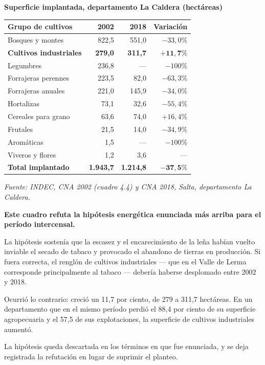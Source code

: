 {\sffamily\bfseries\footnotesize Superficie implantada, departamento La Caldera (hectáreas)\par}
\vspace{0.5em}
{\small
\setlength{\LTpre}{0.6em}\setlength{\LTpost}{1.2em}
\begin{longtable}{@{}lrrr@{}}
\toprule
Grupo de cultivos & 2002 & 2018 & Variación \\
\midrule
\endhead
Bosques y montes & 822,5 & 551,0 & $-33,0\%$ \\
\textbf{Cultivos industriales} & \textbf{279,0} & \textbf{311,7} & $\mathbf{+11,7\%}$ \\
Legumbres & 236,8 & --- & $-100\%$ \\
Forrajeras perennes & 223,5 & 82,0 & $-63,3\%$ \\
Forrajeras anuales & 221,0 & 145,9 & $-34,0\%$ \\
Hortalizas & 73,1 & 32,6 & $-55,4\%$ \\
Cereales para grano & 63,6 & 74,0 & $+16,4\%$ \\
Frutales & 21,5 & 14,0 & $-34,9\%$ \\
Aromáticas & 1,5 & --- & $-100\%$ \\
Viveros y flores & 1,2 & 3,6 & --- \\
\midrule
\textbf{Total implantado} & \textbf{1.943,7} & \textbf{1.214,8} & $\mathbf{-37,5\%}$ \\
\bottomrule
\end{longtable}
}

\textit{Fuente: INDEC, CNA 2002 (cuadro 4.4) y CNA 2018, Salta, departamento La Caldera.}

\textbf{Este cuadro refuta la hipótesis energética enunciada más arriba para el período intercensal.}

La hipótesis sostenía que la escasez y el encarecimiento de la leña habían vuelto inviable el secado de tabaco y provocado el abandono de tierras en producción. Si fuera correcta, el renglón de cultivos industriales --- que en el Valle de Lerma corresponde principalmente al tabaco --- debería haberse desplomado entre 2002 y 2018.

Ocurrió lo contrario: creció un 11,7 por ciento, de 279 a 311,7 hectáreas. En un departamento que en el mismo período perdió el 88,4 por ciento de su superficie agropecuaria y el 57,5 de sus explotaciones, la superficie de cultivos industriales aumentó.

La hipótesis queda descartada en los términos en que fue enunciada, y se deja registrada la refutación en lugar de suprimir el planteo.

